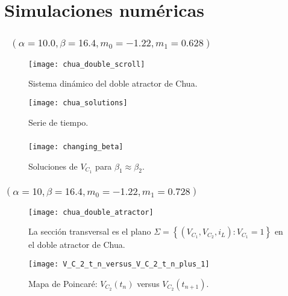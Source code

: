 \section{Simulaciones numéricas}

\begin{frame}
	\frametitle{\secname~$\left(\alpha=10.0, \beta=16.4, m_{0}=-1.22, m_{1}=0.628\right)$}

	\begin{minipage}{0.45\textwidth}
		\begin{figure}[ht!]
			\centering
			\texttt{[image: chua\_double\_scroll]}
			\caption{Sistema dinámico del doble atractor de Chua.}\label{fig:chua_double_scroll}
		\end{figure}
	\end{minipage}
	\begin{minipage}{0.45\textwidth}
		\begin{figure}[ht!]
			\centering
			\texttt{[image: chua\_solutions]}
			\caption{Serie de tiempo.}\label{fig:chua_solutions}
		\end{figure}
	\end{minipage}
\end{frame}

\begin{frame}
	\frametitle{\secname} %

	\begin{figure}[ht!]
		\centering
		\texttt{[image: changing\_beta]}
		\caption{Soluciones de $V_{C_{1}}$ para $\beta_{1}\approx\beta_{2}$.}\label{fig:changing_beta}
	\end{figure}

\end{frame}

\begin{frame}
	\frametitle{\secname\quad$\left(\alpha=10,\beta=16.4,m_{0}=-1.22,m_{1}=0.728\right)$}

	\begin{minipage}{0.45\textwidth}
		\begin{figure}[ht!]
			\centering
			\texttt{[image: chua\_double\_atractor]}
			\caption{La sección transversal es el plano $\Sigma=\left\{\left(V_{C_{1}},V_{C_{2}},i_{L}\right):V_{C_{1}}=1\right\}$ en el doble atractor de Chua.}\label{fig:chua_doble_atractor}
		\end{figure}
	\end{minipage}
	\begin{minipage}{0.45\textwidth}
		\begin{figure}[ht!]
			\centering
			\texttt{[image: V\_C\_2\_t\_n\_versus\_V\_C\_2\_t\_n\_plus\_1]}
			\caption{Mapa de Poincaré: $V_{C_{2}}\left(t_{n}\right)$ versus $V_{C_{2}}\left(t_{n+1}\right)$.}\label{fig:chua_solutions}
		\end{figure}
	\end{minipage}
\end{frame}

